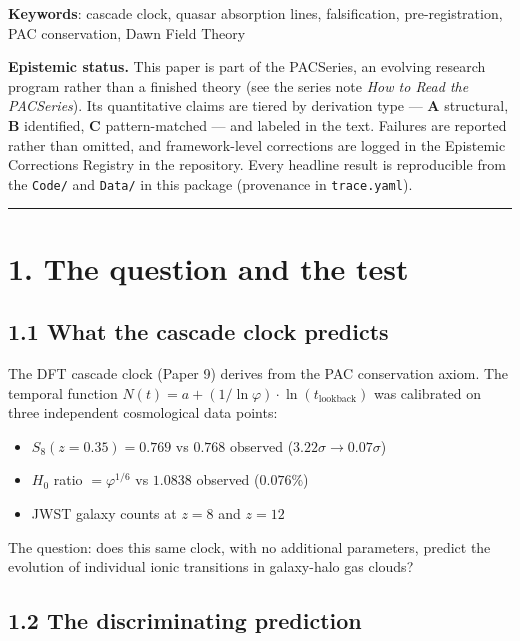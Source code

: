 \documentclass[11pt,a4paper]{article}
\providecommand{\tightlist}{\setlength{\itemsep}{0pt}\setlength{\parskip}{0pt}}
\begin{document}
\textbf{Keywords}: cascade clock, quasar absorption lines, falsification, pre-registration, PAC conservation, Dawn Field Theory

\textbf{Epistemic status.} This paper is part of the PACSeries, an evolving research program rather than a finished theory (see the series note \emph{How to Read the PACSeries}). Its quantitative claims are tiered by derivation type — \textbf{A} structural, \textbf{B} identified, \textbf{C} pattern-matched — and labeled in the text. Failures are reported rather than omitted, and framework-level corrections are logged in the Epistemic Corrections Registry in the repository. Every headline result is reproducible from the \texttt{Code/} and \texttt{Data/} in this package (provenance in \texttt{trace.yaml}).

\begin{center}\rule{0.5\linewidth}{0.4pt}\end{center}

\section*{1. The question and the test}

\subsection*{1.1 What the cascade clock predicts}

The DFT cascade clock (Paper 9) derives from the PAC conservation axiom. The temporal function $N(t) = a + (1/\ln\varphi) \cdot \ln(t_\text{lookback})$ was calibrated on three independent cosmological data points:

\begin{itemize}\tightlist
\item $S_8(z = 0.35) = 0.769$ vs $0.768$ observed ($3.22\sigma \to 0.07\sigma$)
\item $H_0$ ratio $= \varphi^{1/6}$ vs $1.0838$ observed ($0.076\%$)
\item JWST galaxy counts at $z = 8$ and $z = 12$
\end{itemize}

The question: does this same clock, with no additional parameters, predict the evolution of individual ionic transitions in galaxy-halo gas clouds?

\subsection*{1.2 The discriminating prediction}
\end{document}
